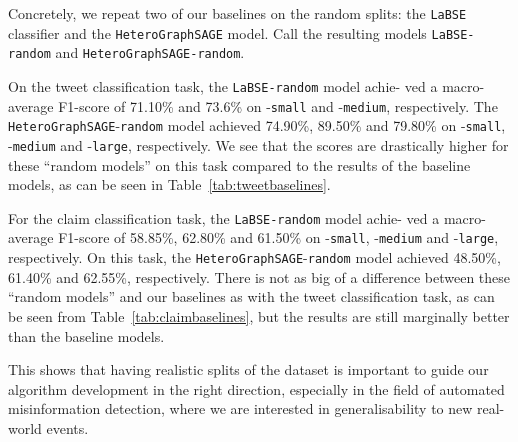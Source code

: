 \documentclass[sigconf,natbib=true,anonymous=false,nonacm]{acmart}
\begin{document}
Concretely, we repeat two of our baselines on the random splits: the
\texttt{LaBSE} classifier and the \texttt{HeteroGraphSAGE} model. Call the
resulting models \texttt{LaBSE-random} and \texttt{HeteroGraphSAGE-random}.

On the tweet classification task, the \texttt{LaBSE-random} model achie-
ved a macro-average F1-score of 71.10\% and 73.6\% on
\datasetname-\texttt{small} and \datasetname-\texttt{medium}, respectively. The
\texttt{HeteroGraphSAGE}-\texttt{random} model achieved 74.90\%,
89.50\% and 79.80\% on \datasetname-\texttt{small},
\datasetname-\texttt{medium} and \datasetname-\texttt{large}, respectively. We
see that the scores are drastically higher for these ``random models'' on this
task compared to the results of the baseline models, as can be seen in
Table~\ref{tab:tweetbaselines}.

For the claim classification task, the \texttt{LaBSE-random} model achie- ved a
macro-average F1-score of 58.85\%, 62.80\% and 61.50\% on
\datasetname-\texttt{small}, \datasetname-\texttt{medium} and
\datasetname-\texttt{large}, respectively. On this task, the
\texttt{HeteroGraphSAGE}-\texttt{random} model achieved 48.50\%, 61.40\% and
62.55\%, respectively. There is not as big of a difference between these
``random models'' and our baselines as with the tweet classification task, as
can be seen from Table~\ref{tab:claimbaselines}, but the results are still
marginally better than the baseline models.

This shows that having realistic splits of the dataset is important to guide
our algorithm development in the right direction, especially in the field of
automated misinformation detection, where we are interested in generalisability
to new real-world events.
\end{document}
